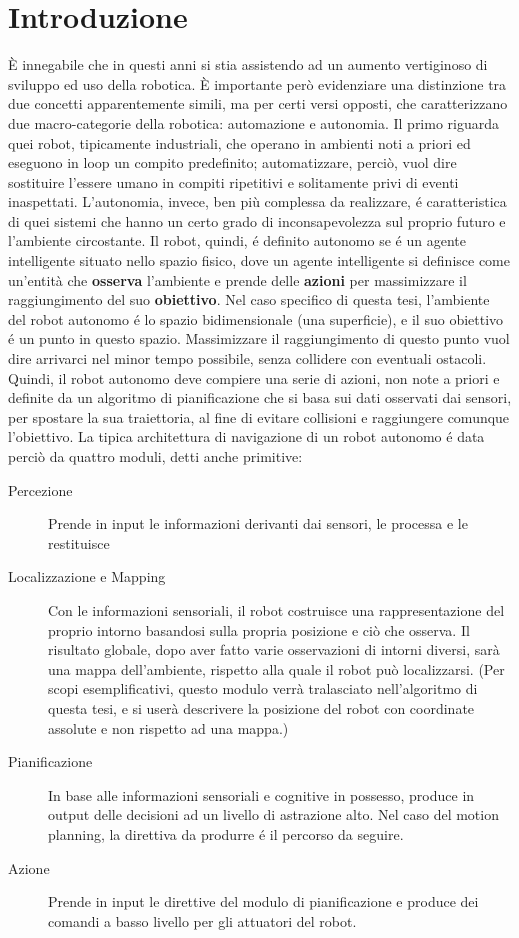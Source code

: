 \documentclass[14pt,a4paper]{extarticle}
\begin{document}
\section{Introduzione}
È innegabile che in questi anni si stia assistendo ad un aumento vertiginoso di sviluppo ed uso della robotica. È importante però evidenziare una distinzione tra due concetti apparentemente simili, ma per certi versi opposti, che caratterizzano due macro-categorie della robotica: automazione e autonomia. Il primo riguarda quei robot, tipicamente industriali, che operano in ambienti noti a priori ed eseguono in loop un compito predefinito; automatizzare, perciò, vuol dire sostituire l'essere umano in compiti ripetitivi e solitamente privi di eventi inaspettati. L'autonomia, invece, ben più complessa da realizzare, é caratteristica di quei sistemi che hanno un certo grado di inconsapevolezza sul proprio futuro e l'ambiente circostante.  Il robot, quindi, é definito autonomo se é un agente intelligente situato nello spazio fisico, dove un agente intelligente si definisce come un'entità che \textbf{osserva} l'ambiente e prende delle \textbf{azioni} per massimizzare il raggiungimento del suo \textbf{obiettivo}\cite{murphy}. Nel caso specifico di questa tesi, l'ambiente del robot autonomo é lo spazio bidimensionale (una superficie), e il suo obiettivo é un punto in questo spazio. Massimizzare il raggiungimento di questo punto vuol dire arrivarci nel minor tempo possibile, senza collidere con eventuali ostacoli. Quindi, il robot autonomo deve compiere una serie di azioni, non note a priori e definite da un algoritmo di pianificazione che si basa sui dati osservati dai sensori, per spostare la sua traiettoria, al fine di evitare collisioni e raggiungere comunque l'obiettivo. La tipica architettura di navigazione di un robot autonomo é data perciò da quattro moduli, detti anche primitive: 
\begin{description}
\item[Percezione] Prende in input le informazioni derivanti dai sensori, le processa e le restituisce
\item[Localizzazione e Mapping] Con le informazioni sensoriali, il robot costruisce una rappresentazione del proprio intorno basandosi sulla propria posizione e ciò che osserva. Il risultato globale, dopo aver fatto varie osservazioni di intorni diversi, sarà una mappa dell'ambiente, rispetto alla quale il robot può localizzarsi. (Per scopi esemplificativi, questo modulo verrà tralasciato nell'algoritmo di questa tesi, e si userà descrivere la posizione del robot con coordinate assolute e non rispetto ad una mappa.)
\item[Pianificazione] In base alle informazioni sensoriali e cognitive in possesso, produce in output delle decisioni ad un livello di astrazione alto. Nel caso del motion planning, la direttiva da produrre é il percorso da seguire.
\item[Azione] Prende in input le direttive del modulo di pianificazione e produce dei comandi a basso livello per gli attuatori del robot.
\end{description}
\end{document}
